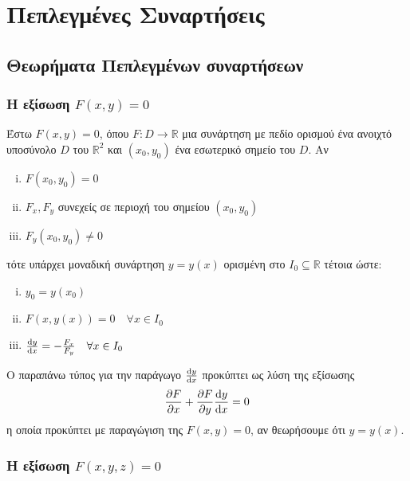 


\everymath{\displaystyle}



\chapter{Πεπλεγμένες Συναρτήσεις}


\section{Θεωρήματα Πεπλεγμένων συναρτήσεων}

\vspace{\baselineskip}

\subsection{Η εξίσωση \ensuremath{F(x,y) = 0}}

Έστω $ F(x,y) = 0 $, όπου $ F\colon D \to \mathbb{R} $ μια συνάρτηση με πεδίο
ορισμού ένα ανοιχτό υποσύνολο $D$ του $\mathbb{R}^{2}$ και $ (x_0,y_0) $ ένα 
εσωτερικό σημείο του $D$.  Αν 
\begin{enumerate}[(i)]
    \item $F(x_0,y_0) = 0$ 
    \item $ F_x, F_y$ συνεχείς σε περιοχή του σημείου $ (x_0,y_0) $ 
    \item $ F_y(x_0,y_0) \neq 0 $
\end{enumerate}
τότε υπάρχει μοναδική συνάρτηση $ y=y(x) $ ορισμένη στο $ I_0 \subseteq \mathbb{R} $ 
τέτοια ώστε:
\begin{enumerate}[(i)]
    \item $y_0 = y(x_0)$
    \item $F(x,y(x)) = 0 \quad \forall x \in I_0$
    \item $ \dv{y}{x} = - \frac{F_x}{F_y} \quad \forall x \in I_0  $
\end{enumerate}

\begin{rem}
    Ο παραπάνω τύπος για την παράγωγο $ \dv{y}{x} $ προκύπτει ως λύση της εξίσωσης
    \[
        \pdv{F}{x} + \pdv{F}{y}\dv{y}{x} = 0 
    \] 
    η οποία προκύπτει με παραγώγιση της $ F(x,y) = 0$, αν θεωρήσουμε ότι $ y=y(x) $.

\end{rem}

\subsection{Η εξίσωση \ensuremath{F(x,y,z) = 0}}


